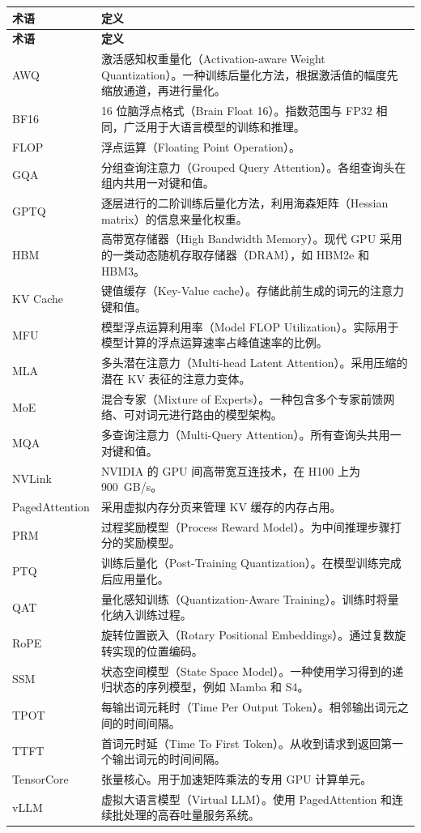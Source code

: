 
\begingroup
\small
\renewcommand{\arraystretch}{1.15}
\begin{longtable}{@{}p{.23\linewidth}p{.73\linewidth}@{}}
\toprule
\textbf{术语} & \textbf{定义} \\
\midrule
\endfirsthead
\toprule
\textbf{术语} & \textbf{定义} \\
\midrule
\endhead
\midrule
\endfoot
\bottomrule
\endlastfoot
AWQ & 激活感知权重量化（Activation-aware Weight Quantization）。一种训练后量化方法，根据激活值的幅度先缩放通道，再进行量化。 \\
BF16 & 16 位脑浮点格式（Brain Float 16）。指数范围与 FP32 相同，广泛用于大语言模型的训练和推理。 \\
FLOP & 浮点运算（Floating Point Operation）。 \\
GQA & 分组查询注意力（Grouped Query Attention）。各组查询头在组内共用一对键和值。 \\
GPTQ & 逐层进行的二阶训练后量化方法，利用海森矩阵（Hessian matrix）的信息来量化权重。 \\
HBM & 高带宽存储器（High Bandwidth Memory）。现代 GPU 采用的一类动态随机存取存储器（DRAM），如 HBM2e 和 HBM3。 \\
KV Cache & 键值缓存（Key-Value cache）。存储此前生成的词元的注意力键和值。 \\
MFU & 模型浮点运算利用率（Model FLOP Utilization）。实际用于模型计算的浮点运算速率占峰值速率的比例。 \\
MLA & 多头潜在注意力（Multi-head Latent Attention）。采用压缩的潜在 KV 表征的注意力变体。 \\
MoE & 混合专家（Mixture of Experts）。一种包含多个专家前馈网络、可对词元进行路由的模型架构。 \\
MQA & 多查询注意力（Multi-Query Attention）。所有查询头共用一对键和值。 \\
NVLink & NVIDIA 的 GPU 间高带宽互连技术，在 H100 上为 900~GB/s。 \\
PagedAttention & 采用虚拟内存分页来管理 KV 缓存的内存占用。 \\
PRM & 过程奖励模型（Process Reward Model）。为中间推理步骤打分的奖励模型。 \\
PTQ & 训练后量化（Post-Training Quantization）。在模型训练完成后应用量化。 \\
QAT & 量化感知训练（Quantization-Aware Training）。训练时将量化纳入训练过程。 \\
RoPE & 旋转位置嵌入（Rotary Positional Embeddings）。通过复数旋转实现的位置编码。 \\
SSM & 状态空间模型（State Space Model）。一种使用学习得到的递归状态的序列模型，例如 Mamba 和 S4。 \\
TPOT & 每输出词元耗时（Time Per Output Token）。相邻输出词元之间的时间间隔。 \\
TTFT & 首词元时延（Time To First Token）。从收到请求到返回第一个输出词元的时间间隔。 \\
TensorCore & 张量核心。用于加速矩阵乘法的专用 GPU 计算单元。 \\
vLLM & 虚拟大语言模型（Virtual LLM）。使用 PagedAttention 和连续批处理的高吞吐量服务系统。 \\
\end{longtable}
\endgroup
